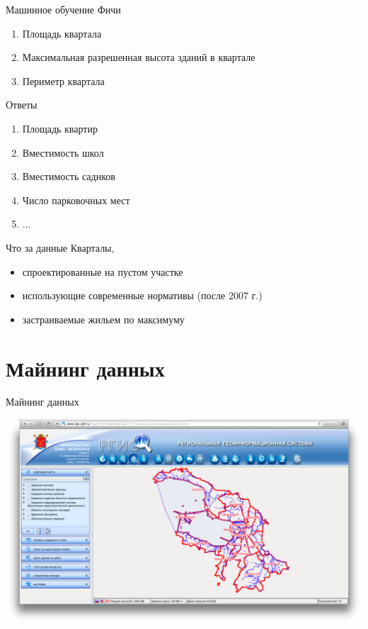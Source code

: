 \documentclass[14pt, fleqn, xcolor={dvipsnames, table}]{beamer}
\begin{document}
        \begin{frame}{Машинное обучение}
            Фичи
            \begin{enumerate}
               \item Площадь квартала
               \item Максимальная разрешенная высота зданий в квартале
               \item Периметр квартала
            \end{enumerate}
            Ответы
            \begin{enumerate}
               \item Площадь квартир
               \item Вместимость школ
               \item Вместимость садиков
               \item Число парковочных мест
               \item ...
            \end{enumerate}           
        \end{frame}
        
        \begin{frame}{Что за данные}
            Кварталы,
            \begin{itemize}
               \item спроектированные на пустом участке
               \item использующие современные нормативы (после 2007 г.)
               \item застраиваемые жильем по максимуму
            \end{itemize}     
        \end{frame}
        
    \section{Майнинг данных}         
        
        \begin{frame}{Майнинг данных}
            \begin{center}
                \includegraphics[scale=0.23]{rgis.png}
            \end{center} 
        \end{frame}
        
\end{document}
